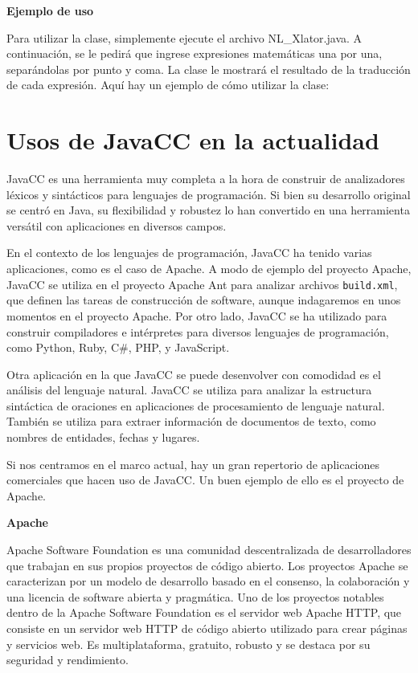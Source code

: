 \phantom{text}

\noindent \textbf{Ejemplo de uso}

\phantom{text}

\noindent Para utilizar la clase, simplemente ejecute el archivo NL\_Xlator.java. A continuación, se le pedirá que ingrese expresiones matemáticas una por una, separándolas por punto y coma. La clase le mostrará el resultado de la traducción de cada expresión.
Aquí hay un ejemplo de cómo utilizar la clase:

\section{Usos de JavaCC en la actualidad}

\noindent JavaCC es una herramienta muy completa a la hora de construir de analizadores léxicos y sintácticos para lenguajes de programación. Si bien su desarrollo original se centró en Java, su flexibilidad y robustez lo han convertido en una herramienta versátil con aplicaciones en diversos campos.

En el contexto de los lenguajes de programación, JavaCC ha tenido varias aplicaciones, como es el caso de Apache. A modo de ejemplo del proyecto Apache, JavaCC se utiliza en el proyecto Apache Ant para analizar archivos  \lstinline|build.xml|, que definen las tareas de construcción de software\cite{apache}, aunque indagaremos en unos momentos en el proyecto Apache. Por otro lado, JavaCC se ha utilizado para construir compiladores e intérpretes para diversos lenguajes de programación, como Python, Ruby, C\#, PHP, y JavaScript\cite{javaccc++preprocessor}.

Otra aplicación en la que JavaCC se puede desenvolver con comodidad es el análisis del lenguaje natural. JavaCC se utiliza para analizar la estructura sintáctica de oraciones en aplicaciones de procesamiento de lenguaje natural\cite{languageprocessing}. También se utiliza para extraer información de documentos de texto, como nombres de entidades, fechas y lugares.

Si nos centramos en el marco actual, hay un gran repertorio de aplicaciones comerciales que hacen uso de JavaCC. Un buen ejemplo de ello es el proyecto de Apache.

\phantom{text}

\noindent \textbf{Apache}

\phantom{text}

\noindent Apache Software Foundation es una comunidad descentralizada de desarrolladores que trabajan en sus propios proyectos de código abierto. Los proyectos Apache se caracterizan por un modelo de desarrollo basado en el consenso, la colaboración y una licencia de software abierta y pragmática\cite{apachepaginaoficial}. Uno de los proyectos notables dentro de la Apache Software Foundation es el servidor web Apache HTTP, que consiste en un servidor web HTTP de código abierto utilizado para crear páginas y servicios web. Es multiplataforma, gratuito, robusto y se destaca por su seguridad y rendimiento\cite{apachehttp}.

